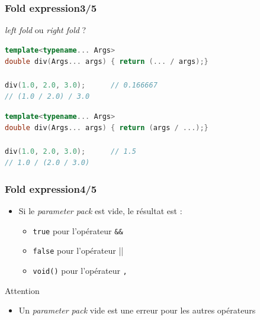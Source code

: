 \documentclass[C++.tex]{subfiles}
\begin{document}
\begin{frame}[fragile]
	\frametitle{Fold expression\titlehfill{}3/5}
	
	\begin{alertblock}{\textit{left fold} ou \textit{right fold} ?}
	
	\begin{lstlisting}[language=C++]
template<typename... Args>
double div(Args... args) { return (... / args);}

div(1.0, 2.0, 3.0);      // 0.166667
// (1.0 / 2.0) / 3.0\end{lstlisting}

	\begin{lstlisting}[language=C++]
template<typename... Args>
double div(Args... args) { return (args / ...);}

div(1.0, 2.0, 3.0);      // 1.5
// 1.0 / (2.0 / 3.0)\end{lstlisting}
	\end{alertblock}
\end{frame}

\begin{frame}[fragile]
	\frametitle{Fold expression\titlehfill{}4/5}
	\begin{itemize}
		\item Si le \textit{parameter pack} est vide, le résultat est :
		\begin{itemize}
			\item \lstinline|true| pour l'opérateur \lstinline|&&|
			\item \lstinline|false| pour l'opérateur \lstinline||||
			\item \lstinline|void()| pour l'opérateur \lstinline|,|
		\end{itemize}
	\end{itemize}

	\begin{alertblock}{Attention}
		\begin{itemize}
			\item Un \textit{parameter pack} vide est une erreur pour les autres opérateurs
		\end{itemize}
	\end{alertblock}
\end{frame}
\end{document}
